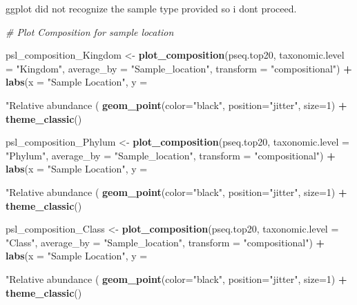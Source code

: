 \documentclass[]{article}
\newenvironment{Shaded}{\begin{snugshade}}{\end{snugshade}}
\newcommand{\CommentTok}[1]{\textcolor[rgb]{0.56,0.35,0.01}{\textit{#1}}}
\newcommand{\DataTypeTok}[1]{\textcolor[rgb]{0.13,0.29,0.53}{#1}}
\newcommand{\DecValTok}[1]{\textcolor[rgb]{0.00,0.00,0.81}{#1}}
\newcommand{\KeywordTok}[1]{\textcolor[rgb]{0.13,0.29,0.53}{\textbf{#1}}}
\newcommand{\NormalTok}[1]{#1}
\newcommand{\OperatorTok}[1]{\textcolor[rgb]{0.81,0.36,0.00}{\textbf{#1}}}
\newcommand{\StringTok}[1]{\textcolor[rgb]{0.31,0.60,0.02}{#1}}
\begin{document}
ggplot did not recognize the sample type provided so i dont proceed.

\begin{Shaded}
\begin{Highlighting}[]
\CommentTok{# Plot Composition for sample location}

\NormalTok{psl_composition_Kingdom <-}\StringTok{ }\KeywordTok{plot_composition}\NormalTok{(pseq.top20, }\DataTypeTok{taxonomic.level =} \StringTok{"Kingdom"}\NormalTok{, }\DataTypeTok{average_by =} \StringTok{"Sample_location"}\NormalTok{, }\DataTypeTok{transform =} \StringTok{"compositional"}\NormalTok{) }\OperatorTok{+}
\StringTok{  }\KeywordTok{labs}\NormalTok{(}\DataTypeTok{x =} \StringTok{"Sample Location"}\NormalTok{, }\DataTypeTok{y =} \StringTok{"Relative abundance (%)"}\NormalTok{, }\DataTypeTok{title =} \StringTok{"Relative abundance data"}\NormalTok{, }\DataTypeTok{subtitle =} \StringTok{"Kingdom"}\NormalTok{) }\OperatorTok{+}
\StringTok{  }\KeywordTok{geom_point}\NormalTok{(}\DataTypeTok{color=}\StringTok{"black"}\NormalTok{, }\DataTypeTok{position=}\StringTok{"jitter"}\NormalTok{, }\DataTypeTok{size=}\DecValTok{1}\NormalTok{) }\OperatorTok{+}\StringTok{ }\KeywordTok{theme_classic}\NormalTok{()}

\NormalTok{psl_composition_Phylum <-}\StringTok{ }\KeywordTok{plot_composition}\NormalTok{(pseq.top20, }\DataTypeTok{taxonomic.level =} \StringTok{"Phylum"}\NormalTok{, }\DataTypeTok{average_by =} \StringTok{"Sample_location"}\NormalTok{, }\DataTypeTok{transform =} \StringTok{"compositional"}\NormalTok{) }\OperatorTok{+}
\StringTok{  }\KeywordTok{labs}\NormalTok{(}\DataTypeTok{x =} \StringTok{"Sample Location"}\NormalTok{, }\DataTypeTok{y =} \StringTok{"Relative abundance (%)"}\NormalTok{, }\DataTypeTok{title =} \StringTok{"Relative abundance data"}\NormalTok{, }\DataTypeTok{subtitle =} \StringTok{"Phylum"}\NormalTok{) }\OperatorTok{+}
\StringTok{  }\KeywordTok{geom_point}\NormalTok{(}\DataTypeTok{color=}\StringTok{"black"}\NormalTok{, }\DataTypeTok{position=}\StringTok{"jitter"}\NormalTok{, }\DataTypeTok{size=}\DecValTok{1}\NormalTok{) }\OperatorTok{+}\StringTok{ }\KeywordTok{theme_classic}\NormalTok{()}

\NormalTok{psl_composition_Class <-}\StringTok{ }\KeywordTok{plot_composition}\NormalTok{(pseq.top20, }\DataTypeTok{taxonomic.level =} \StringTok{"Class"}\NormalTok{, }\DataTypeTok{average_by =} \StringTok{"Sample_location"}\NormalTok{, }\DataTypeTok{transform =} \StringTok{"compositional"}\NormalTok{) }\OperatorTok{+}
\StringTok{  }\KeywordTok{labs}\NormalTok{(}\DataTypeTok{x =} \StringTok{"Sample Location"}\NormalTok{, }\DataTypeTok{y =} \StringTok{"Relative abundance (%)"}\NormalTok{, }\DataTypeTok{title =} \StringTok{"Relative abundance data"}\NormalTok{, }\DataTypeTok{subtitle =} \StringTok{"Class"}\NormalTok{) }\OperatorTok{+}
\StringTok{  }\KeywordTok{geom_point}\NormalTok{(}\DataTypeTok{color=}\StringTok{"black"}\NormalTok{, }\DataTypeTok{position=}\StringTok{"jitter"}\NormalTok{, }\DataTypeTok{size=}\DecValTok{1}\NormalTok{) }\OperatorTok{+}\StringTok{ }\KeywordTok{theme_classic}\NormalTok{()}

}}}
\end{Highlighting}
\end{Shaded}
\end{document}
